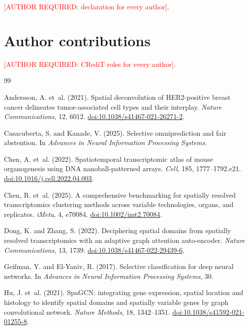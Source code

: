 \documentclass[12pt]{article}
\newcommand{\required}[1]{\textcolor{red}{[AUTHOR REQUIRED: #1]}}
\begin{document}
\required{declaration for every author}.

\section*{Author contributions}

\required{CRediT roles for every author}.


\begin{thebibliography}{99}

Andersson, A. et~al. (2021). Spatial deconvolution of HER2-positive breast
cancer delineates tumor-associated cell types and their interplay.
\emph{Nature Communications}, 12, 6012.
\href{https://doi.org/10.1038/s41467-021-26271-2}{doi:10.1038/s41467-021-26271-2}.

Casacuberta, S. and Kanade, V. (2025). Selective omniprediction and fair
abstention. In \emph{Advances in Neural Information Processing Systems}.

Chen, A. et~al. (2022). Spatiotemporal transcriptomic atlas of mouse
organogenesis using DNA nanoball-patterned arrays. \emph{Cell}, 185,
1777--1792.e21. \href{https://doi.org/10.1016/j.cell.2022.04.003}{doi:10.1016/j.cell.2022.04.003}.

Chen, R. et~al. (2025). A comprehensive benchmarking for spatially resolved
transcriptomics clustering methods across variable technologies, organs, and
replicates. \emph{iMeta}, 4, e70084.
\href{https://doi.org/10.1002/imt2.70084}{doi:10.1002/imt2.70084}.

Dong, K. and Zhang, S. (2022). Deciphering spatial domains from spatially
resolved transcriptomics with an adaptive graph attention auto-encoder.
\emph{Nature Communications}, 13, 1739.
\href{https://doi.org/10.1038/s41467-022-29439-6}{doi:10.1038/s41467-022-29439-6}.

Geifman, Y. and El-Yaniv, R. (2017). Selective classification for deep neural
networks. In \emph{Advances in Neural Information Processing Systems}, 30.

Hu, J. et~al. (2021). SpaGCN: integrating gene expression, spatial location
and histology to identify spatial domains and spatially variable genes by
graph convolutional network. \emph{Nature Methods}, 18, 1342--1351.
\href{https://doi.org/10.1038/s41592-021-01255-8}{doi:10.1038/s41592-021-01255-8}.


\end{thebibliography}
\end{document}

